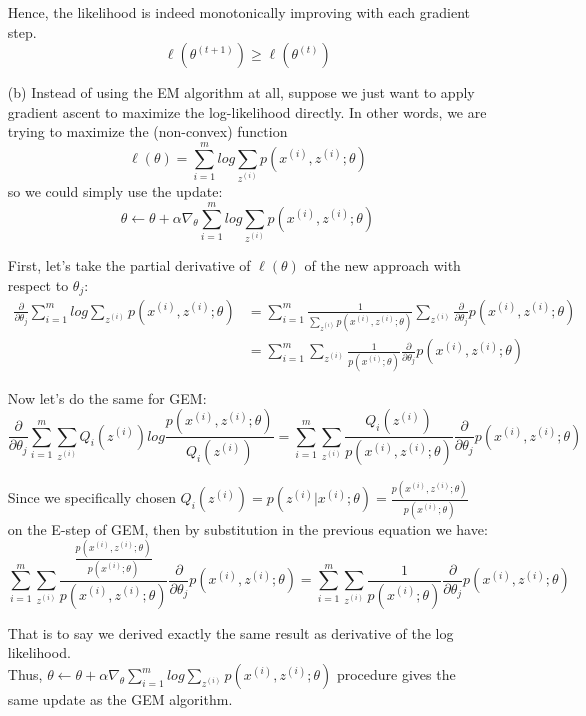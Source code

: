 \documentclass{article}
\newcommand{\ith}{^{(i)}}
\begin{document}
\begin{itemize}
	Hence, the likelihood is indeed monotonically improving with each gradient step.
	$$\ell(\theta^{(t+1)}) \ge \ell(\theta^{(t)})$$ 
	
	
	\item[(b)] Instead of using the EM algorithm at all, suppose we just want to apply gradient ascent to maximize
	the log-likelihood directly. In other words, we are trying to maximize the (non-convex) function
	$$\ell(\theta) = \sum_{i=1}^{m} log \sum_{z\ith}^{} p(x\ith, z\ith; \theta)$$
	so we could simply use the update:
	$$ \theta \leftarrow \theta + \alpha \nabla_\theta \sum_{i=1}^{m} log \sum_{z\ith}^{} p(x\ith, z\ith; \theta)$$
	
	First, let's take the partial derivative of $\ell(\theta)$ of the new approach with respect to $\theta_j$:
	\begin{align*}
	\frac{\partial}{\partial \theta_j} \sum_{i=1}^{m} log \sum_{z\ith}^{} p(x\ith, z\ith; \theta) &=
	\sum_{i=1}^{m} \frac{1}
	{\sum_{z\ith}^{}   p(x\ith, z\ith; \theta)}	
	\sum_{z\ith}^{} \frac{\partial}{\partial \theta_j}  p(x\ith, z\ith; \theta)\\ &=
	\sum_{i=1}^{m} \sum_{z\ith}^{} \frac{1}{p(x\ith; \theta)} 
	\frac{\partial}{\partial \theta_j}  p(x\ith, z\ith; \theta)
	\end{align*}
	
	Now let's do the same for GEM:
	$$\frac{\partial}{\partial \theta_j} \sum_{i=1}^{m} \sum_{z\ith}^{} Q_i(z\ith) 
	log \frac{p(x\ith, z\ith; \theta)}{Q_i(z\ith)} 
	= \sum_{i=1}^{m} \sum_{z\ith}^{} \frac{Q_i(z\ith)}{p(x\ith, z\ith; \theta)} 
		\frac{\partial}{\partial \theta_j} p(x\ith, z\ith; \theta)$$
		
	Since we specifically chosen 
	$Q_i(z\ith)  = p(z\ith | x \ith; \theta) = \frac{p(x\ith, z\ith; \theta)}{p(x\ith; \theta)}$ 
	on the E-step of GEM, then by substitution in the previous equation we have:
	$$
	\sum_{i=1}^{m} \sum_{z\ith}^{} \frac{\frac{p(x\ith, z\ith; \theta)}{p(x\ith; \theta)}}{p(x\ith, z\ith; \theta)} 
	\frac{\partial}{\partial \theta_j} p(x\ith, z\ith; \theta)
	= \sum_{i=1}^{m} \sum_{z\ith}^{} \frac{1}{p(x\ith; \theta)} \frac{\partial}{\partial \theta_j} p(x\ith, z\ith; \theta)$$
	
	That is to say we derived exactly the same result as derivative of the log likelihood. \\
	Thus, $ \theta \leftarrow \theta + \alpha \nabla_\theta \sum_{i=1}^{m} log \sum_{z\ith}^{} p(x\ith, z\ith; \theta)$ procedure gives the same update as the GEM algorithm.
	

	
\end{itemize}


	
	
     
\end{document}
